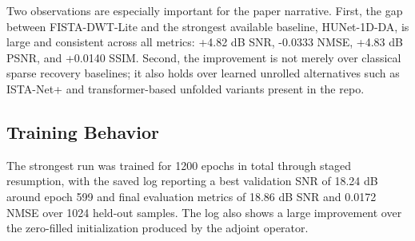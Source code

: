 \documentclass{article}
\begin{document}
\begin{table}[t]
  \centering
  \small
  \caption{Recorded ratio-8 1D reconstruction results on the held-out split from repository evaluation reports. Best results are bold.}
  \label{tab:main_results}
\end{table}

Two observations are especially important for the paper narrative. First, the gap between FISTA-DWT-Lite and the strongest available baseline, HUNet-1D-DA, is large and consistent across all metrics: +4.82 dB SNR, -0.0333 NMSE, +4.83 dB PSNR, and +0.0140 SSIM. Second, the improvement is not merely over classical sparse recovery baselines; it also holds over learned unrolled alternatives such as ISTA-Net+ and transformer-based unfolded variants present in the repo.

\subsection{Training Behavior}
The strongest run was trained for 1200 epochs in total through staged resumption, with the saved log reporting a best validation SNR of 18.24 dB around epoch 599 and final evaluation metrics of 18.86 dB SNR and 0.0172 NMSE over 1024 held-out samples. The log also shows a large improvement over the zero-filled initialization produced by the adjoint operator.
\end{document}

